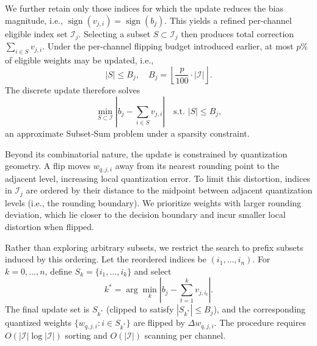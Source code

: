 \documentclass[table, 11pt]{article}
\begin{document}
We further retain only those indices for which the update reduces the bias magnitude, i.e.,
$\operatorname{sign}(v_{j,i}) = \operatorname{sign}(b_j)$. This yields a refined per-channel eligible index set $\mathcal{I}_j$. 
Selecting a subset $S \subset \mathcal{I}_j$ then produces total correction 
$\sum_{i \in S} v_{j,i}$. 
Under the per-channel flipping budget introduced earlier, at most $p\%$ of eligible weights may be updated, i.e.,
\[
|S| \le B_j, 
\quad 
B_j = \left\lfloor \frac{p}{100} \cdot |\mathcal{I}| \right\rfloor.
\]
The discrete update therefore solves
\[
\min_{S \subset \mathcal{I}}
\left|
b_j - \sum_{i \in S} v_{j,i}
\right|
\quad
\text{s.t. } |S| \le B_j,
\]
an approximate Subset-Sum problem under a sparsity constraint.

Beyond its combinatorial nature, the update is constrained by quantization geometry. 
A flip moves $w_{q,j,i}$ away from its nearest rounding point to the adjacent level, increasing local quantization error. 
To limit this distortion, indices in $\mathcal{I}_j$ are ordered by their distance to the midpoint between adjacent quantization levels (i.e., the rounding boundary). We prioritize weights with larger rounding deviation, which lie closer to the decision boundary and incur smaller local distortion when flipped.

Rather than exploring arbitrary subsets, we restrict the search to prefix subsets induced by this ordering. 
Let the reordered indices be $(i_1,\dots,i_n)$. 
For $k=0,\dots,n$, define $S_k = \{i_1,\dots,i_k\}$ and select
\[
k^* = \arg\min_k 
\left|
b_j - \sum_{t=1}^{k} v_{j,i_t}
\right|.
\]
The final update set is $S_{k^*}$ (clipped to satisfy $|S_{k^*}| \le B_j$), and the corresponding quantized weights $\{w_{q,j,i} : i \in S_{k^*}\}$ are flipped by $\Delta w_{q,j,i}$. 
The procedure requires $O(|\mathcal{I}| \log |\mathcal{I}|)$ sorting and $O(|\mathcal{I}|)$ scanning per channel.



\end{document}

